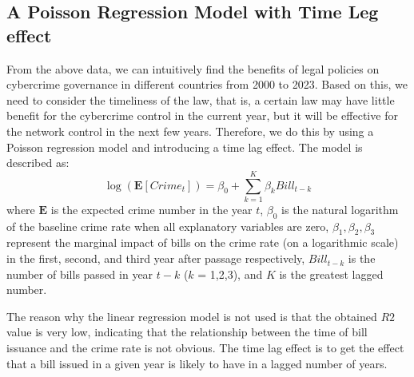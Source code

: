 \subsection{A Poisson Regression Model with Time Leg effect}\label{subsec:a-poisson-regression-model-with-time-leg-effect} %
    From the above data,
    we can intuitively find the benefits of legal policies on cybercrime governance in different countries from 2000 to 2023.
    Based on this, we need to consider the timeliness of the law, that is,
    a certain law may have little benefit for the cybercrime control in the current year,
    but it will be effective for the network control in the next few years.
    Therefore, we do this by using a Poisson regression model and introducing a time lag effect.
    The model is described as:
    \[ \log(\mathbf{E}[Crime_t]) = \beta_0 + \sum_{k=1}^{K} \beta_k Bill_{t-k} \]
    where \(\mathbf{E}\) is the expected crime number in the year \(t\),
    \(\beta_0\) is the natural logarithm of the baseline crime rate when all explanatory variables are zero,
    \(\beta_1, \beta_2, \beta_3\) represent the marginal impact of bills on the crime rate (on a logarithmic scale)
    in the first, second, and third year after passage respectively,
    \(Bill_{t-k}\) is the number of bills passed in year \(t-k\) (\(k\) = 1,2,3), and
    \(K\) is the greatest lagged number.

    The reason why the linear regression model is not used is that the obtained \(R2\) value is very low,
    indicating that the relationship between the time of bill issuance and the crime rate is not obvious.
    The time lag effect is to get the effect that a bill issued in a given year is likely to have in a lagged number of years.

